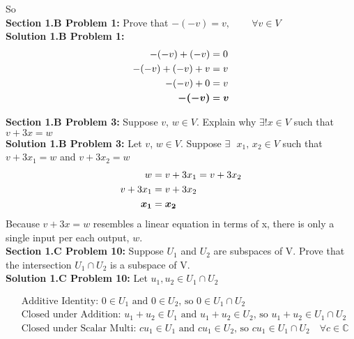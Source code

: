 \documentclass[12pt]{article}
\begin{document}
\noindent So \text{ \boldmath $(\alpha \beta) \lambda = \alpha (\beta \lambda)$} \\


\vspace{\baselineskip}
\noindent\textbf{Section 1.B Problem 1: } Prove that $-(-v)=v \text{, } \qquad \forall v \in V$ \\

\noindent \textbf{Solution 1.B Problem 1: } \\
	\begin{align}
		-(-v) + (-v) &= 0 \\
		-(-v) + (-v) + v &= v \\
		-(-v) + 0 &= v \\
		\text{\boldmath $-(-v) $} &= \text{\boldmath $v$}
	\end{align}
	
\vspace{\baselineskip}
\noindent\textbf{Section 1.B Problem 3: } Suppose $v$, $w \in V$. Explain why $\exists ! x \in V$ such that $v+3x =w$ \\ 

\noindent \textbf{Solution 1.B Problem 3: } Let $v$, $w \in V$. Suppose $\exists \text{ }x_1 \text{, } x_2 \in V$ such that $v+3x_1 =w$ and $v+3x_2 =w$ \\

	\begin{align}
		w &= v + 3x_1 = v + 3x_2	\\
		v + 3x_1 &= v + 3x_2 \\
		\text{\boldmath $x_1$} &= \text{\boldmath $x_2$}
	\end{align}
Because $v + 3x = w$ resembles a linear equation in terms of x, there is only a single input per each output, $w$. \\

\vspace{\baselineskip}
\noindent\textbf{Section 1.C Problem 10: }Suppose $U_1$ and $U_2$ are subspaces of V. Prove that the intersection $U_1 \cap U_2$ is a subspace of V. \\

\noindent\textbf{Solution 1.C Problem 10: } Let $u_1, u_2 \in U_1 \cap U_2$

	\begin{align}
		& \text{Additive Identity: } 0 \in U_1 \text{ and } 0 \in U_2 \text{, so } 0 \in U_1 \cap U_2 \\
		& \text{Closed under Addition: } u_1 + u_2 \in U_1 \text{ and } u_1 + u_2 \in U_2 \text{, so } u_1 + u_2 \in U_1 \cap U_2 \\
		& \text{Closed under Scalar Multi: } cu_1 \in U_1 \text{ and } cu_1 \in U_2 \text{, so } cu_1 \in U_1 \cap U_2 \quad \forall c \in \mathbb{C}
	\end{align}
	
\end{document}
